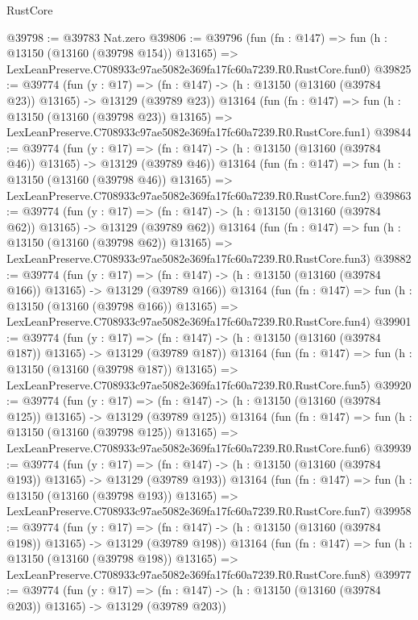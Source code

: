 \begin{lexlean}{RustCore}
\begin{coremodule}
@39798 := @39783 Nat.zero
@39806 := @39796
    (fun (fn : @147) =>
    fun (h : @13150 (@13160 (@39798 @154)) @13165) =>
    LexLeanPreserve.C708933c97ae5082e369fa17fc60a7239.R0.RustCore.fun0)
@39825 := @39774
    (fun (y : @17) =>
    (fn : @147) -> (h : @13150 (@13160 (@39784 @23)) @13165) -> @13129 (@39789 @23))
    @13164
    (fun (fn : @147) =>
    fun (h : @13150 (@13160 (@39798 @23)) @13165) =>
    LexLeanPreserve.C708933c97ae5082e369fa17fc60a7239.R0.RustCore.fun1)
@39844 := @39774
    (fun (y : @17) =>
    (fn : @147) -> (h : @13150 (@13160 (@39784 @46)) @13165) -> @13129 (@39789 @46))
    @13164
    (fun (fn : @147) =>
    fun (h : @13150 (@13160 (@39798 @46)) @13165) =>
    LexLeanPreserve.C708933c97ae5082e369fa17fc60a7239.R0.RustCore.fun2)
@39863 := @39774
    (fun (y : @17) =>
    (fn : @147) -> (h : @13150 (@13160 (@39784 @62)) @13165) -> @13129 (@39789 @62))
    @13164
    (fun (fn : @147) =>
    fun (h : @13150 (@13160 (@39798 @62)) @13165) =>
    LexLeanPreserve.C708933c97ae5082e369fa17fc60a7239.R0.RustCore.fun3)
@39882 := @39774
    (fun (y : @17) =>
    (fn : @147) -> (h : @13150 (@13160 (@39784 @166)) @13165) -> @13129 (@39789 @166))
    @13164
    (fun (fn : @147) =>
    fun (h : @13150 (@13160 (@39798 @166)) @13165) =>
    LexLeanPreserve.C708933c97ae5082e369fa17fc60a7239.R0.RustCore.fun4)
@39901 := @39774
    (fun (y : @17) =>
    (fn : @147) -> (h : @13150 (@13160 (@39784 @187)) @13165) -> @13129 (@39789 @187))
    @13164
    (fun (fn : @147) =>
    fun (h : @13150 (@13160 (@39798 @187)) @13165) =>
    LexLeanPreserve.C708933c97ae5082e369fa17fc60a7239.R0.RustCore.fun5)
@39920 := @39774
    (fun (y : @17) =>
    (fn : @147) -> (h : @13150 (@13160 (@39784 @125)) @13165) -> @13129 (@39789 @125))
    @13164
    (fun (fn : @147) =>
    fun (h : @13150 (@13160 (@39798 @125)) @13165) =>
    LexLeanPreserve.C708933c97ae5082e369fa17fc60a7239.R0.RustCore.fun6)
@39939 := @39774
    (fun (y : @17) =>
    (fn : @147) -> (h : @13150 (@13160 (@39784 @193)) @13165) -> @13129 (@39789 @193))
    @13164
    (fun (fn : @147) =>
    fun (h : @13150 (@13160 (@39798 @193)) @13165) =>
    LexLeanPreserve.C708933c97ae5082e369fa17fc60a7239.R0.RustCore.fun7)
@39958 := @39774
    (fun (y : @17) =>
    (fn : @147) -> (h : @13150 (@13160 (@39784 @198)) @13165) -> @13129 (@39789 @198))
    @13164
    (fun (fn : @147) =>
    fun (h : @13150 (@13160 (@39798 @198)) @13165) =>
    LexLeanPreserve.C708933c97ae5082e369fa17fc60a7239.R0.RustCore.fun8)
@39977 := @39774
    (fun (y : @17) =>
    (fn : @147) -> (h : @13150 (@13160 (@39784 @203)) @13165) -> @13129 (@39789 @203))

\end{coremodule}
\end{lexlean}
